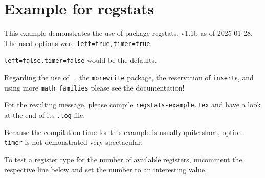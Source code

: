 \documentclass[british]{article}
\makeatletter
\newcommand{\stressCounter}[1]{%
  \ifnum\the\count10<#1\relax\else\message{Already \the\count10 \space counters used.} \fi%
  \@tempcnta=0\relax%
  \@whilenum\the\count10<#1\do%
    {\advance\@tempcnta +1\relax%
     \newcounter{TestCounter\the\@tempcnta} \message{counter \the\allocationnumber ^^J}%
    }%
  }
\newcommand{\stressDimen}[1]{%
  \ifnum\the\count11<#1\relax\else\message{Already \the\count11 \space dimens used.} \fi%
  \@tempcnta=0\relax%
  \@whilenum\the\count11<#1\do%
    {\advance\@tempcnta +1\relax%
     \expandafter\newdimen\csname TestDimen\the\@tempcnta\endcsname \message{dimen \the\allocationnumber ^^J}%
    }%
  }
\newcommand{\stressSkip}[1]{\%
  \ifnum\the\count12<#1\relax\else\message{Already \the\count11 \space skips used.} \fi%
  \@tempcnta=0\relax%
  \@whilenum\the\count12<#1\do%
    {\advance\@tempcnta +1\relax%
     \expandafter\newskip\csname TestSkip\the\@tempcnta\endcsname \message{skip \the\allocationnumber ^^J}%
    }%
  }
\newcommand{\stressMuskip}[1]{%
  \ifnum\the\count13<#1\relax\else\message{Already \the\count11 \space muskips used.} \fi%
  \@tempcnta=0\relax%
  \@whilenum\the\count13<#1\do%
    {\advance\@tempcnta +1\relax%
     \expandafter\newmuskip\csname TestMuskip\the\@tempcnta\endcsname \message{muskip \the\allocationnumber ^^J}%
    }%
  }
\newcommand{\stressBox}[1]{%
  \ifnum\the\count14<#1\relax\else\message{Already \the\count11 \space boxes used.} \fi%
  \@tempcnta=0\relax%
  \@whilenum\the\count14<#1\do%
    {\advance\@tempcnta +1\relax%
     \expandafter\newbox\csname TestBox\the\@tempcnta\endcsname \message{box \the\allocationnumber ^^J}%
    }%
  }
\newcommand{\stressToks}[1]{%
  \ifnum\the\count15<#1\relax\else\message{Already \the\count11 \space toks used.} \fi%
  \@tempcnta=0\relax%
  \@whilenum\the\count15<#1\do%
    {\advance\@tempcnta +1\relax%
     \expandafter\newtoks\csname TestToks\the\@tempcnta\endcsname \message{toks \the\allocationnumber ^^J}%
    }%
  }
\newcommand{\stressRead}[1]{%
  \ifnum\the\count16<#1\relax\else\message{Already \the\count11 \space reads used.} \fi%
  \@tempcnta=0\relax%
  \@whilenum\the\count16<#1\do%
    {\advance\@tempcnta +1\relax%
     \expandafter\newread\csname TestRead\the\@tempcnta\endcsname \message{read \the\allocationnumber ^^J}%
    }%
  }
\newcommand{\stressWrite}[1]{%
  \ifnum\the\count17<#1\relax\else\message{Already \the\count11 \space writes used.} \fi%
  \@tempcnta=0\relax%
  \@whilenum\the\count17<#1\do%
    {\advance\@tempcnta +1\relax%
     \expandafter\newwrite\csname TestWrite\the\@tempcnta\endcsname \message{write \the\allocationnumber ^^J}%
    }%
  }
\newcommand{\stressFam}[1]{%
  \ifnum\the\count18<#1\relax\else\message{Already \the\count11 \space fams used.} \fi%
  \@tempcnta=0\relax%
  \@whilenum\the\count18<#1\do%
    {\advance\@tempcnta +1\relax%
     \expandafter\newfam\csname TestFam\the\@tempcnta\endcsname \message{fam \the\allocationnumber ^^J}%
    }%
  }
\newcommand{\stressLanguage}[1]{%
  \ifnum\the\count19<#1\relax\else\message{Already \the\count11 \space languages used.} \fi%
  \@tempcnta=0\relax%
  \@whilenum\the\count19<#1\do%
    {\advance\@tempcnta +1\relax%
     \expandafter\newlanguage\csname TestLanguage\the\@tempcnta\endcsname \message{language \the\allocationnumber ^^J}%
    }%
  }
\newcommand{\stressInsert}[1]{%
 \message{Declaring #1\space ADDITIONAL inserts:}%
 \@tempcnta=0\relax%
 \@whilenum\the\@tempcnta<#1\do%
  {\advance\@tempcnta +1\relax%
   \expandafter\newinsert\csname TestInsert\the\@tempcnta\endcsname%
   \message{insert \the\@tempcnta: \the\allocationnumber^^J}%
  }%
 }
\makeatother
\begin{document}
\section*{Example for regstats}

This example demonstrates the use of package\newline
\textsf{regstats}, v1.1b as of 2025-01-28.\newline
The used options were \texttt{left=true,timer=true}.\par
\texttt{left=false,timer=false} would be the defaults.\newline

Regarding the use of
\makeatletter%
\ , %
\makeatother%
the \texttt{morewrite} package, the reservation of \texttt{insert}s,
and using more \texttt{math families} please see the documentation!\newline

For the resulting message, please compile \texttt{regstats-example.tex}
and have a look at the end of its \texttt{.log}-file.\newline

Because the compilation time for this example is usually quite short,
option \texttt{timer} is not demonstrated very spectacular.\newline

To test a register type for the number of available registers,
uncomment the respective line below and set the number to an interesting value.

\makeatletter
\makeatother
\end{document}
